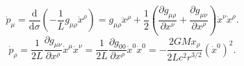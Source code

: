 \documentclass[a4paper, 14pt]{extarticle}
\title{}
\begin{document}
	\maketitle
\[
	\dot{p}_\mu=\frac{\mathrm{d} }{\mathrm{d} \sigma} \left( 
	- \frac{1}{L}g_{\mu\rho}\dot{x}^\rho\right)=
	g_{\mu\rho} \ddot{x}^\rho+\frac{1}{2}\left( 
	\frac{\partial g_{\mu\rho}}{\partial x^\nu} +
\frac{\partial g_{\mu\nu}}{\partial x^\rho} \right) \dot{x}^\nu \dot{x}^\rho
.\] 
\[
\dot{p}_\rho=\frac{1}{2L} \frac{\partial g_{\mu\nu}}{\partial x^\rho} \dot{x}^\mu \dot{x}^\nu=
\frac{1}{2L}\frac{\partial g_{00}}{\partial x^\rho} 
\dot{x}^0\dot{x}^0=
-\frac{2G M x_\rho}{2L c^2 r^{3 /2}}\left( \dot{x}^0 \right) ^2
.\] 
\end{document}
